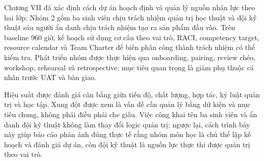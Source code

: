 Chương VII đã xác định cách dự án hoạch định và quản lý nguồn nhân lực theo hai lớp: Nhóm 2 gồm ba sinh viên chịu trách nhiệm quản trị học thuật và đội kỹ thuật sáu người ẩn danh chịu trách nhiệm tạo ra sản phẩm đầu vào. Trên baseline 960 giờ, kế hoạch sử dụng cơ cấu theo vai trò, RACI, competency target, resource calendar và Team Charter để biến phân công thành trách nhiệm có thể kiểm tra. Phát triển nhóm được thực hiện qua onboarding, pairing, review chéo, workshop, rehearsal và retrospective; mục tiêu quan trọng là giảm phụ thuộc cá nhân trước UAT và bàn giao.

Hiệu suất được đánh giá cân bằng giữa tiến độ, chất lượng, hợp tác, kỷ luật quản trị và học tập. Xung đột được xem là vấn đề cần quản lý bằng dữ kiện và mục tiêu chung, không phải điều phải che giấu. Việc công khai tên ba sinh viên và ẩn danh đội kỹ thuật không làm thay đổi logic quản trị; ngược lại, cách trình bày này giúp báo cáo phản ánh đúng thực tế rằng nhóm môn học là chủ thể lập kế hoạch và đánh giá dự án, còn đội kỹ thuật là nguồn lực thực thi được quản trị theo vai trò.
